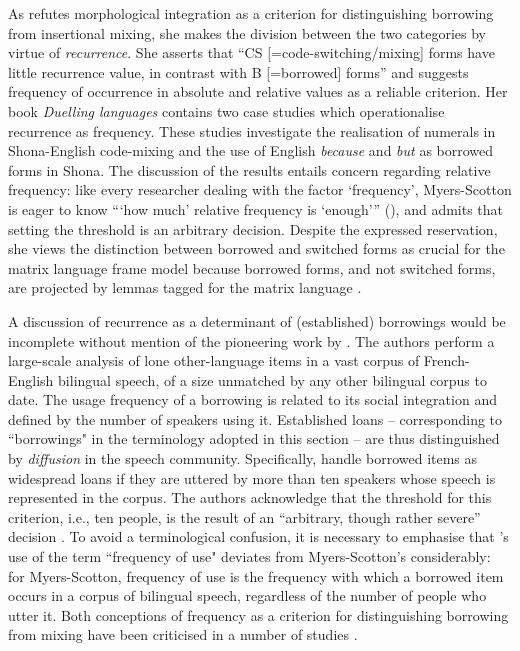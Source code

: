 As \citet{myers-scotton-duelling-1993} refutes morphological integration as a criterion for distinguishing borrowing from insertional mixing, she makes the division between the two categories by virtue of \textit{recurrence}.
She asserts that ``CS [=code-switching/mixing] forms have little recurrence value, in contrast with B [=borrowed] forms'' \citep[163]{myers-scotton-duelling-1993} and suggests frequency of occurrence in absolute and relative values as a reliable criterion. Her book \textit{Duelling languages} contains two case studies which operationalise recurrence as frequency. These studies investigate the realisation of numerals in Shona-English code-mixing and the use of English \textit{because} and \textit{but} as borrowed forms in Shona. The discussion of the results entails concern regarding relative frequency: like every researcher dealing with the factor `frequency', Myers-Scotton is eager to know ```how much' relative frequency is {`enough'}{''} (\citeyear[204]{myers-scotton-duelling-1993}), and admits that setting the threshold is an arbitrary decision. Despite the expressed reservation, she views the distinction between borrowed and switched forms  as crucial for the matrix language frame model because borrowed forms, and not switched forms, are projected by lemmas tagged for the matrix language \citep[41]{myers-scotton-contact-2002}. 

A discussion of recurrence as a determinant of (established) borrowings would be incomplete without mention of the pioneering work by \citet{poplack-etal-1988}. The authors perform a large-scale analysis of lone other-language items in a vast corpus of French-English bilingual speech, of a size unmatched by any other bilingual corpus to date. The usage frequency of a borrowing is related to its social integration and defined by the number of speakers using it. Established loans -- corresponding to ``borrowings" in the terminology adopted in this section -- are thus distinguished by \textit{diffusion} in the speech community. Specifically, \citet[55]{poplack-etal-1988} handle borrowed items as widespread loans if they are uttered by more than ten speakers whose speech is represented in the corpus. The authors acknowledge that the threshold for this criterion, i.e., ten people, is the result of an ``arbitrary, though rather severe'' decision \citep[100]{poplack-etal-1988}. To avoid a terminological confusion, it is necessary to emphasise that \citeauthor[]{poplack-etal-1988}'s use of the term ``frequency of use" deviates from Myers-Scotton's considerably: for Myers-Scotton, frequency of use is the frequency with which a borrowed item occurs in a corpus of bilingual speech, regardless of the number of people who utter it. Both conceptions of frequency as a criterion for distinguishing borrowing from mixing have been criticised in a number of studies \citep[e.g.,][]{haust-codeswitching-1995, boumans-syntax-1998,muhamedowa-untersuchung-2006, stammers-deuchar-2012}.

